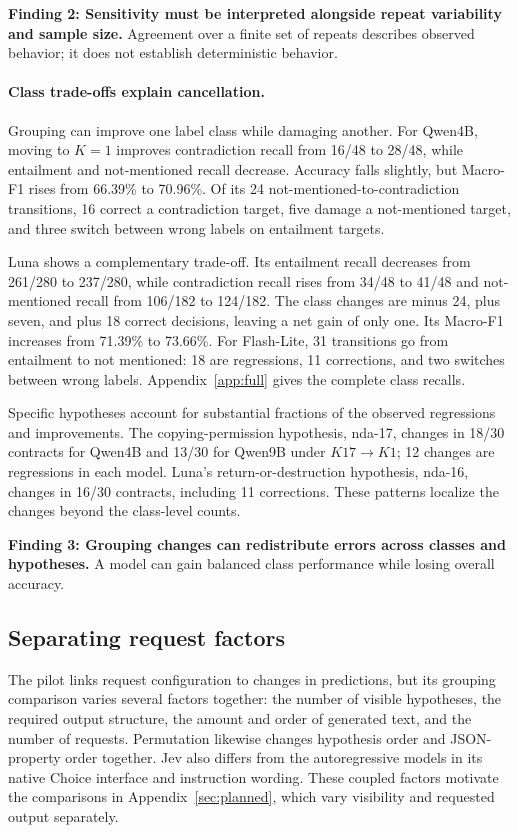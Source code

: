 \textbf{Finding 2: Sensitivity must be interpreted alongside repeat variability and sample size.} Agreement over a finite set of repeats describes observed behavior; it does not establish deterministic behavior.

\paragraph{Class trade-offs explain cancellation.}
Grouping can improve one label class while damaging another. For Qwen4B, moving to $K=1$ improves contradiction recall from 16/48 to 28/48, while entailment and not-mentioned recall decrease. Accuracy falls slightly, but Macro-F1 rises from 66.39\% to 70.96\%. Of its 24 not-mentioned-to-contradiction transitions, 16 correct a contradiction target, five damage a not-mentioned target, and three switch between wrong labels on entailment targets.

Luna shows a complementary trade-off. Its entailment recall decreases from 261/280 to 237/280, while contradiction recall rises from 34/48 to 41/48 and not-mentioned recall from 106/182 to 124/182. The class changes are minus 24, plus seven, and plus 18 correct decisions, leaving a net gain of only one. Its Macro-F1 increases from 71.39\% to 73.66\%. For Flash-Lite, 31 transitions go from entailment to not mentioned: 18 are regressions, 11 corrections, and two switches between wrong labels. Appendix~\ref{app:full} gives the complete class recalls.

Specific hypotheses account for substantial fractions of the observed regressions and improvements. The copying-permission hypothesis, nda-17, changes in 18/30 contracts for Qwen4B and 13/30 for Qwen9B under $K17\to K1$; 12 changes are regressions in each model. Luna's return-or-destruction hypothesis, nda-16, changes in 16/30 contracts, including 11 corrections. These patterns localize the changes beyond the class-level counts.

\textbf{Finding 3: Grouping changes can redistribute errors across classes and hypotheses.} A model can gain balanced class performance while losing overall accuracy.


\subsection{Separating request factors}
The pilot links request configuration to changes in predictions, but its grouping comparison varies several factors together: the number of visible hypotheses, the required output structure, the amount and order of generated text, and the number of requests. Permutation likewise changes hypothesis order and JSON-property order together. Jev also differs from the autoregressive models in its native Choice interface and instruction wording. These coupled factors motivate the comparisons in Appendix~\ref{sec:planned}, which vary visibility and requested output separately.

